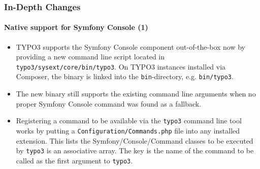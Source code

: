 \begin{frame}[fragile]
	\frametitle{In-Depth Changes}
	\framesubtitle{Native support for Symfony Console (1)}

	\lstset{basicstyle=\tiny\ttfamily}

	\begin{itemize}

		\item TYPO3 supports the Symfony Console component out-of-the-box now by providing
			a new command line script located in \texttt{typo3/sysext/core/bin/typo3}.
			On TYPO3 instances installed via Composer, the binary is linked into the
			\texttt{bin}-directory, e.g. \texttt{bin/typo3}.

		\item The new binary still supports the existing command line arguments when no
			proper Symfony Console command was found as a fallback.

		\item Registering a command to be available via the \texttt{typo3} command line
			tool works by putting a \texttt{Configuration/Commands.php} file into any
			installed extension. This lists the Symfony/Console/Command classes to be
			executed by \texttt{typo3} is an associative array. The key is the name of
			the command to be called as the first argument to \texttt{typo3}.

	\end{itemize}

\end{frame}

